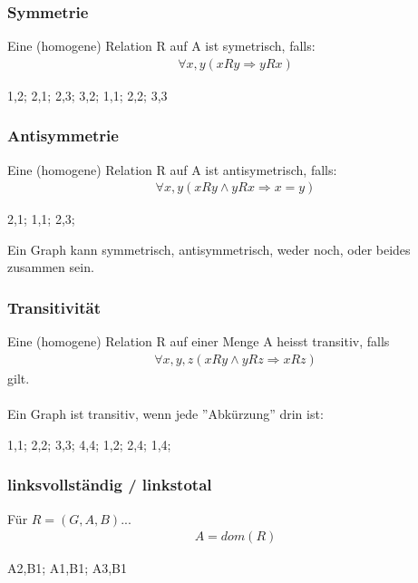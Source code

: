 \subsubsection{Symmetrie}
Eine (homogene) Relation R auf A ist symetrisch, falls:
\begin{align*}
    \forall{x,y} (xRy \Rightarrow yRx)
\end{align*}
\begin{center}
    {
    1,2;
    2,1;
    2,3;
    3,2;
    1,1;
    2,2;
    3,3
    }
    \symetrisch{}
\end{center}
\subsubsection{Antisymmetrie}
Eine (homogene) Relation R auf A ist antisymetrisch, falls:
\begin{align*}
    \forall{x,y} (xRy \wedge yRx \Rightarrow x = y)
\end{align*}
\begin{center}
    {
    2,1;
    1,1;
    2,3;
    }
    \antisymmetrisch{}
\end{center}
Ein Graph kann symmetrisch, antisymmetrisch, weder noch, oder beides zusammen sein.
\subsubsection{Transitivität} 
Eine (homogene) Relation R auf einer Menge A heisst transitiv,
falls
\begin{align*}
    \forall{x,y,z} (xRy \wedge yRz \Rightarrow xRz)
\end{align*}
gilt.\\\\
Ein Graph ist transitiv, wenn jede ''Abkürzung'' drin ist:\\
\begin{center}
    {
    1,1;
    2,2;
    3,3;
    4,4;
    1,2;
    2,4;
    1,4;
    }
    \transitiv{}
\end{center}
\subsubsection{linksvollständig / linkstotal}
Für  $R = (G,A,B)$...
    \begin{align*}
        A = dom(R)
    \end{align*}
\begin{center}
        {
        A2,B1;
        A1,B1;
        A3,B1
        }
    \linkstotal{}
\end{center}
